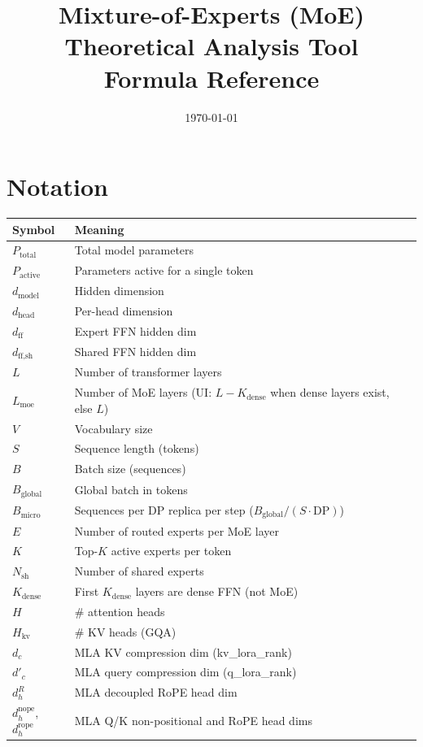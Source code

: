 \documentclass[11pt]{article}
\title{Mixture-of-Experts (MoE) Theoretical Analysis Tool\\Formula Reference}
\author{}
\date{\today}
\begin{document}
\maketitle

\section{Notation}

\begin{tabular}{ll}
\toprule
Symbol & Meaning \\
\midrule
$P_{\text{total}}$ & Total model parameters \\
$P_{\text{active}}$ & Parameters active for a single token \\
$d_{\text{model}}$ & Hidden dimension \\
$d_{\text{head}}$ & Per-head dimension \\
$d_{\text{ff}}$ & Expert FFN hidden dim \\
$d_{\text{ff,sh}}$ & Shared FFN hidden dim \\
$L$ & Number of transformer layers \\
$L_{\text{moe}}$ & Number of MoE layers (UI: $L - K_{\text{dense}}$ when dense layers exist, else $L$) \\
$V$ & Vocabulary size \\
$S$ & Sequence length (tokens) \\
$B$ & Batch size (sequences) \\
$B_{\text{global}}$ & Global batch in tokens \\
$B_{\text{micro}}$ & Sequences per DP replica per step ($B_{\text{global}}/(S \cdot \mathrm{DP})$) \\
$E$ & Number of routed experts per MoE layer \\
$K$ & Top-$K$ active experts per token \\
$N_{\text{sh}}$ & Number of shared experts \\
$K_{\text{dense}}$ & First $K_{\text{dense}}$ layers are dense FFN (not MoE) \\
$H$ & \# attention heads \\
$H_{\text{kv}}$ & \# KV heads (GQA) \\
$d_c$ & MLA KV compression dim (kv\_lora\_rank) \\
$d'_c$ & MLA query compression dim (q\_lora\_rank) \\
$d^R_h$ & MLA decoupled RoPE head dim \\
$d^{\text{nope}}_h$, $d^{\text{rope}}_h$ & MLA Q/K non-positional and RoPE head dims \\

\end{tabular}
\end{document}
